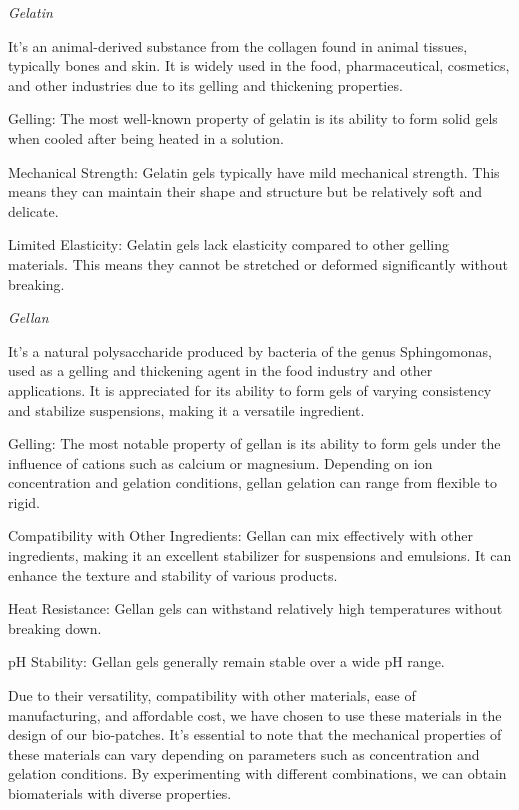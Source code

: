 \textit{Gelatin}

It's an animal-derived substance from the collagen found in animal tissues, typically bones and skin. It is widely used in the food, pharmaceutical, cosmetics, and other industries due to its gelling and thickening properties.
\item Gelling: The most well-known property of gelatin is its ability to form solid gels when cooled after being heated in a solution.
\item Mechanical Strength: Gelatin gels typically have mild mechanical strength. This means they can maintain their shape and structure but be relatively soft and delicate.
\item Limited Elasticity: Gelatin gels lack elasticity compared to other gelling materials. This means they cannot be stretched or deformed significantly without breaking.

\textit{Gellan}

It's a natural polysaccharide produced by bacteria of the genus Sphingomonas, used as a gelling and thickening agent in the food industry and other applications. It is appreciated for its ability to form gels of varying consistency and stabilize suspensions, making it a versatile ingredient.

\item Gelling: The most notable property of gellan is its ability to form gels under the influence of cations such as calcium or magnesium. Depending on ion concentration and gelation conditions, gellan gelation can range from flexible to rigid.

\item Compatibility with Other Ingredients: Gellan can mix effectively with other ingredients, making it an excellent stabilizer for suspensions and emulsions. It can enhance the texture and stability of various products.

\item Heat Resistance: Gellan gels can withstand relatively high temperatures without breaking down.

\item pH Stability: Gellan gels generally remain stable over a wide pH range.

Due to their versatility, compatibility with other materials, ease of manufacturing, and affordable cost, we have chosen to use these materials in the design of our bio-patches. It’s essential to note that the mechanical properties of these materials can vary depending on parameters such as concentration and gelation conditions. By experimenting with different combinations, we can obtain biomaterials with diverse properties.

